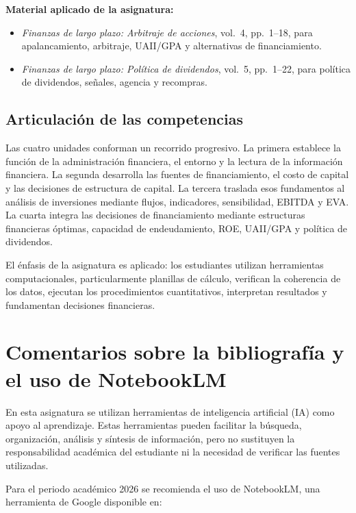 \documentclass[10pt]{article}
\begin{document}
\textbf{Material aplicado de la asignatura:}
\begin{itemize}
    \item \textit{Finanzas de largo plazo: Arbitraje de acciones}, vol.~4,
    pp.~1--18, para apalancamiento, arbitraje, UAII/GPA y alternativas de
    financiamiento.
    \item \textit{Finanzas de largo plazo: Política de dividendos}, vol.~5,
    pp.~1--22, para política de dividendos, señales, agencia y recompras.
\end{itemize}
\parencite{vanhorne2010fundamentos,brigham2020fundamentos,armoa2026arbitraje,armoa2026dividendos}

\subsection{Articulación de las competencias}

Las cuatro unidades conforman un recorrido progresivo. La primera establece
la función de la administración financiera, el entorno y la lectura de la
información financiera. La segunda desarrolla las fuentes de financiamiento,
el costo de capital y las decisiones de estructura de capital. La tercera
traslada esos fundamentos al análisis de inversiones mediante flujos,
indicadores, sensibilidad, EBITDA y EVA. La cuarta integra las decisiones de
financiamiento mediante estructuras financieras óptimas, capacidad de
endeudamiento, ROE, UAII/GPA y política de dividendos.
\parencite{uaProgramaFinanzasLargoPlazo,armoa2026planeamiento}

El énfasis de la asignatura es aplicado: los estudiantes utilizan herramientas
computacionales, particularmente planillas de cálculo, verifican la coherencia
de los datos, ejecutan los procedimientos cuantitativos, interpretan resultados
y fundamentan decisiones financieras.

\section{Comentarios sobre la bibliografía y el uso de NotebookLM}

En esta asignatura se utilizan herramientas de inteligencia artificial (IA) como apoyo al aprendizaje. Estas herramientas pueden facilitar la búsqueda, organización, análisis y síntesis de información, pero no sustituyen la responsabilidad académica del estudiante ni la necesidad de verificar las fuentes utilizadas.

Para el periodo académico 2026 se recomienda el uso de NotebookLM, una herramienta de Google disponible en:\parencite{googleNotebookLM}
\end{document}
